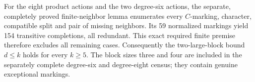 For the eight product actions and the two degree-six actions, the
separate, completely proved finite-neighbor lemma enumerates every
$C$-marking, character, compatible split and pair of missing neighbors.
Its 59 normalized markings yield 154 transitive completions, all
redundant. This exact required finite premise therefore excludes all
remaining cases. Consequently the two-large-block bound $d\leq k$
holds for every $k\geq5$. The block sizes three and four are included
in the separately complete degree-six and degree-eight census; they
contain genuine exceptional markings.
